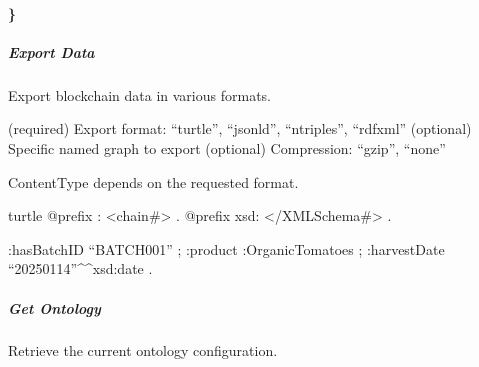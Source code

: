 \documentclass[letterpaper,10pt,english]{sphinxmanual}
\begin{document}
\paragraph{\}}
\label{\detokenize{api/rest-api:id53}}

\subparagraph{Export Data}
\label{\detokenize{api/rest-api:export-data}}
\sphinxAtStartPar
Export blockchain data in various formats.

\sphinxAtStartPar
{} 

\sphinxAtStartPar
{}
\sphinxhyphen{}  (required) \sphinxhyphen{} Export format: “turtle”, “jsonld”, “ntriples”, “rdfxml”
\sphinxhyphen{}  (optional) \sphinxhyphen{} Specific named graph to export
\sphinxhyphen{}  (optional) \sphinxhyphen{} Compression: “gzip”, “none”

\sphinxAtStartPar
{}
Content\sphinxhyphen{}Type depends on the requested format.

\sphinxAtStartPar
{}
{\color{red}\bfseries{}\textasciigrave{}\textasciigrave{}}{\color{red}\bfseries{}\textasciigrave{}}turtle
@prefix : \textless{}\sphinxhyphen{}chain\#\textgreater{} .
@prefix xsd: \textless{}/XMLSchema\#\textgreater{} .
\begin{description}
\sphinxAtStartPar
:hasBatchID “BATCH\sphinxhyphen{}001” ;
:product :OrganicTomatoes ;
:harvestDate “2025\sphinxhyphen{}01\sphinxhyphen{}14”\textasciicircum{}\textasciicircum{}xsd:date .

\end{description}

\sphinxAtStartPar
{\color{red}\bfseries{}\textasciigrave{}\textasciigrave{}}{\color{red}\bfseries{}\textasciigrave{}}


\subparagraph{Get Ontology}
\label{\detokenize{api/rest-api:get-ontology}}
\sphinxAtStartPar
Retrieve the current ontology configuration.

\sphinxAtStartPar
{} 
\end{document}
